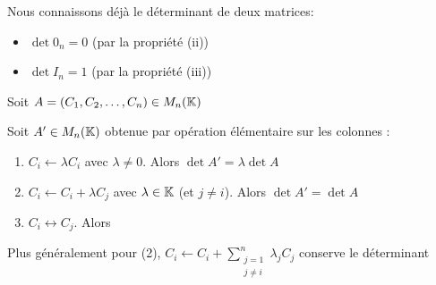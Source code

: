 \begin{frame}

Nous connaissons déjà le déterminant de deux matrices:
\begin{itemize}
  \item \pause $\det 0_n = 0$ (par la propriété (ii))
  \item \pause $\det I_n =1$ (par la propriété (iii))
\end{itemize}

\pause

\begin{proposition}
Soit $A = \left( C_1, C_2, \ldots, C_n\right) \in M_n(\mathbb{K})$

\pause

Soit $A'\in M_n(\mathbb{K})$ obtenue par opération élémentaire sur les colonnes :
\begin{enumerate}
  \item\pause $C_i \leftarrow \lambda C_i$ avec $\lambda \neq 0$.  \pause Alors $\det A' = \lambda \det A$
    
  \item\pause $C_i \leftarrow C_i+\lambda C_j$ avec $\lambda \in \mathbb{K}$ (et $j\neq i$). \pause Alors $\det A' = \det A$
  
  \item\pause $C_i \leftrightarrow C_j$. \pause Alors 
\end{enumerate}
\end{proposition}

\pause

Plus généralement pour (2), $C_i \leftarrow C_i+\displaystyle\sum_{\substack{j=1 \\ j\neq i}}^n\lambda_j C_j$ conserve le déterminant

\end{frame}


